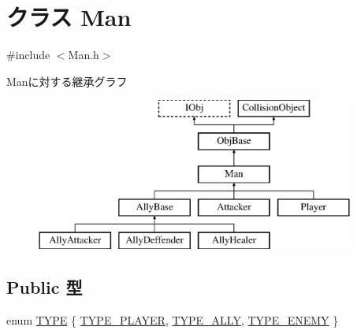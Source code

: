 \hypertarget{class_man}{\section{クラス Man}
\label{class_man}
}


{\ttfamily \#include $<$Man.\-h$>$}

Manに対する継承グラフ\begin{figure}[H]
\begin{center}
\leavevmode
\includegraphics[height=5.000000cm]{da/d50/class_man}
\end{center}
\end{figure}
\subsection*{Public 型}
\begin{DoxyCompactItemize}
\item 
enum \hyperlink{class_man_af2f4c50db54b697f45e30dd4161d0d7c}{T\-Y\-P\-E} \{ \hyperlink{class_man_af2f4c50db54b697f45e30dd4161d0d7cada6e6038f584f5ccbde9f530082f393d}{T\-Y\-P\-E\-\_\-\-P\-L\-A\-Y\-E\-R}, 
\hyperlink{class_man_af2f4c50db54b697f45e30dd4161d0d7ca732a9be8100053674a530fb2bdac88f2}{T\-Y\-P\-E\-\_\-\-A\-L\-L\-Y}, 
\hyperlink{class_man_af2f4c50db54b697f45e30dd4161d0d7caf6fc26730ecb44acc87edef3f3b752d8}{T\-Y\-P\-E\-\_\-\-E\-N\-E\-M\-Y}
 \}
\end{DoxyCompactItemize}
